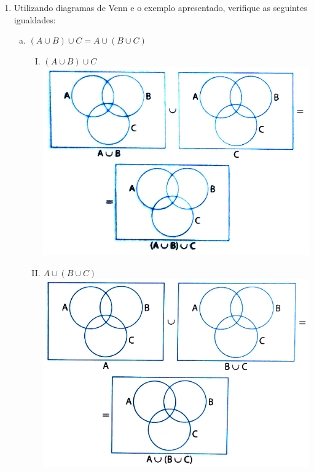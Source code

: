 \documentclass[a4paper,14pt]{article}
\begin{document}
    \begin{multicols}{2}
    		\begin{enumerate}
    			\item Utilizando diagramas de Venn e o exemplo apresentado, verifique as seguintes igualdades:
    			\begin{enumerate}[a)]
    				\item $(A \cup B) \cup C = A \cup (B \cup C)$
    				\begin{enumerate}[I.]
    					\item $(A \cup B) \cup C$ \\
    					\noindent\includegraphics[width=1.1\linewidth]{"6FMA54_imagens/imagem3"} \\
    					\item $A \cup (B \cup C)$ \\
    					\noindent\includegraphics[width=1.1\linewidth]{"6FMA54_imagens/imagem4"} \newpage

\end{enumerate}
\end{enumerate}
\end{enumerate}
\end{multicols}
\end{document}
